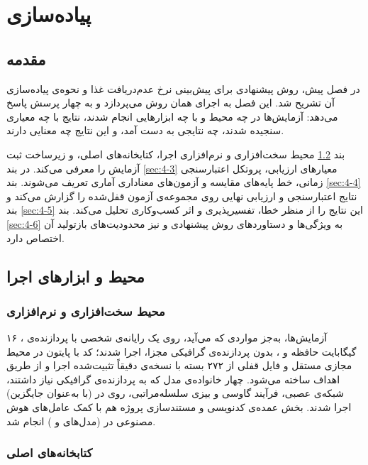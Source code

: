 \chapter{پیاده‌سازی}

\section{مقدمه}
\label{sec:4-1}

در فصل پیش، روش پیشنهادی برای پیش‌بینی نرخ عدم‌دریافت غذا و نحوه‌ی پیاده‌سازی آن تشریح
شد. این فصل به اجرای همان روش می‌پردازد و به چهار پرسش پاسخ می‌دهد: آزمایش‌ها در چه
محیط و با چه ابزارهایی انجام شدند، نتایج با چه معیاری سنجیده شدند، چه نتایجی به دست
آمد، و این نتایج چه معنایی دارند.

بند \ref{sec:4-2} محیط سخت‌افزاری و نرم‌افزاری اجرا، کتابخانه‌های اصلی، و زیرساخت ثبت آزمایش را
معرفی می‌کند. در بند \ref{sec:4-3} معیارهای ارزیابی، پروتکل اعتبارسنجی زمانی، خط پایه‌های مقایسه
و آزمون‌های معناداری آماری تعریف می‌شوند. بند \ref{sec:4-4} نتایج اعتبارسنجی و ارزیابی نهایی روی
مجموعه‌ی آزمون قفل‌شده را گزارش می‌کند و بند \ref{sec:4-5} این نتایج را از منظر خطا، تفسیرپذیری و
اثر کسب‌وکاری تحلیل می‌کند. بند \ref{sec:4-6} به ویژگی‌ها و دستاوردهای روش پیشنهادی و نیز
محدودیت‌های بازتولید آن اختصاص دارد.

\section{محیط و ابزارهای اجرا}
\label{sec:4-2}

\subsection{محیط سخت‌افزاری و نرم‌افزاری}
\label{sec:4-2-1}

آزمایش‌ها، به‌جز مواردی که می‌آید، روی یک رایانه‌ی شخصی با پردازنده‌ی
، ۱۶ گیگابایت حافظه و ، بدون
پردازنده‌ی گرافیکی مجزا، اجرا شدند؛ کد با پایتون  در محیط مجازی
مستقل و فایل قفلی از ۲۷۲ بسته با نسخه‌ی دقیقاً تثبیت‌شده اجرا و از طریق اهداف
 ساخته می‌شود. چهار خانواده‌ی مدل که به پردازنده‌ی
گرافیکی نیاز داشتند، شبکه‌ی عصبی، فرآیند گاوسی و بیزی سلسله‌مراتبی، روی
 در  (با  به‌عنوان جایگزین) اجرا شدند.
بخش عمده‌ی کدنویسی و مستندسازی پروژه هم با کمک عامل‌های هوش مصنوعی در
 (مدل‌های  و ) انجام شد.

\subsection{کتابخانه‌های اصلی}
\label{sec:4-2-2}

